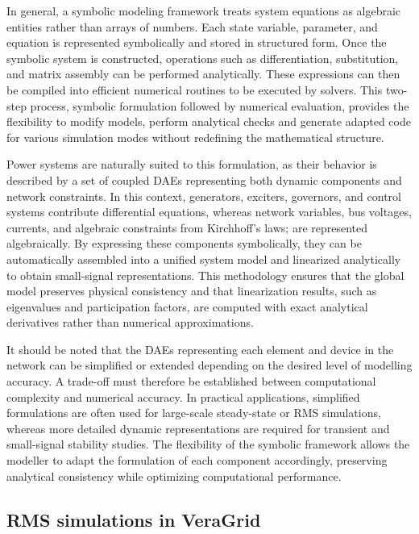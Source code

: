 In general, a symbolic modeling framework treats system equations as algebraic entities rather than arrays of numbers. Each state variable, parameter, and equation
is represented symbolically and stored in structured form. Once the symbolic system is constructed, operations such as differentiation, substitution, and matrix assembly
can be performed analytically. These expressions can then be compiled into efficient numerical routines to be executed by solvers. 
This two-step process, symbolic formulation followed by numerical evaluation, provides the flexibility to modify models, perform analytical checks
and generate adapted code for various simulation modes without redefining the mathematical structure.

Power systems are naturally suited to this formulation, as their behavior is described by a set of coupled DAEs representing both dynamic components and network constraints.
In this context, generators, exciters, governors, and control systems contribute differential equations, whereas network variables, bus voltages, currents, and algebraic 
constraints from Kirchhoff's laws; are represented algebraically. By expressing these components symbolically, they can be automatically assembled into a unified 
system model and linearized analytically to obtain small-signal representations. This methodology ensures that the global model preserves physical consistency and that 
linearization results, such as eigenvalues and participation factors, are computed with exact analytical derivatives rather than numerical approximations.

It should be noted that the DAEs representing each element and device in the network can be simplified or extended depending on the desired level of modelling accuracy. 
A trade-off must therefore be established between computational complexity and numerical accuracy. In practical applications, simplified formulations are often used for 
large-scale steady-state or RMS simulations, whereas more detailed dynamic representations are required for transient and small-signal stability studies. The flexibility 
of the symbolic framework allows the modeller to adapt the formulation of each component accordingly, preserving analytical consistency while optimizing computational 
performance.

\subsection{RMS simulations in VeraGrid}

